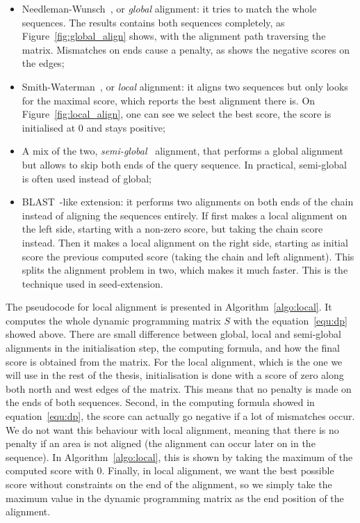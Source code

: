  \begin{itemize}
 	\item Needleman-Wunsch~\cite{NeedlemanWunsch:method}, or \emph{global} alignment: it tries to match the whole sequences. The results contains both sequences completely, as Figure~\ref{fig:global_align} shows, with the alignment path traversing the matrix. Mismatches on ends cause a penalty, as shows the negative scores on the edges;
	\item Smith-Waterman~\cite{SmithWaterman:identification}, or \emph{local} alignment: it aligns two sequences but only looks for the maximal score, which reports the best alignment there is. On Figure~\ref{fig:local_align}, one can see we select the best score, the score is initialised at 0 and stays positive;
	\item A mix of the two, \emph{semi-global}~\cite{Durand:course-genomics} alignment, that performs a global alignment but allows to skip both ends of the query sequence. In practical, semi-global is often used instead of global;
	\item BLAST~\cite{Altschul:BLAST}-like extension: it performs two alignments on both ends of the chain instead of aligning the sequences entirely. If first makes a local alignment on the left side, starting with a non-zero score, but taking the chain score instead. Then it makes a local alignment on the right side, starting as initial score the previous computed score (taking the chain and left alignment). This splits the alignment problem in two, which makes it much faster. This is the technique used in seed-extension.
\end{itemize}

The pseudocode for local alignment is presented in Algorithm~\ref{algo:local}. It computes the whole dynamic programming matrix $S$ with the equation~\ref{equ:dp} showed above. There are small difference between global, local and semi-global alignments in the initialisation step, the computing formula, and how the final score is obtained from the matrix. For the local alignment, which is the one we will use in the rest of the thesis, initialisation is done with a score of zero along both north and west edges of the matrix. This means that no penalty is made on the ends of both sequences. Second, in the computing formula showed in equation~\ref{equ:dp}, the score can actually go negative if a lot of mismatches occur. We do not want this behaviour with local alignment, meaning that there is no penalty if an area is not aligned (the alignment can occur later on in the sequence). In Algorithm~\ref{algo:local}, this is shown by taking the maximum of the computed score with 0. Finally, in local alignment, we want the best possible score without constraints on the end of the alignment, so we simply take the maximum value in the dynamic programming matrix as the end position of the alignment.


